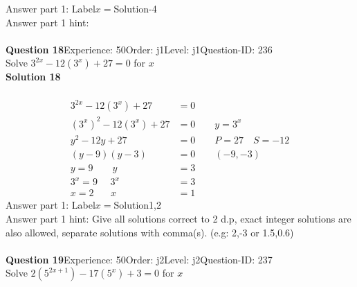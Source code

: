 \documentclass{article}
\begin{document}
Answer part 1: \hspace{10pt}Label\hspace{10pt}$x=$\hspace{10pt}Solution\hspace{10pt}-4\\
Answer part 1 hint: \hspace{15pt}\\
\\[4pt]
\noindent\textbf{Question 18}\hspace{20pt}Experience: 50\hspace{20pt}Order: j1\hspace{20pt}Level: j1\hspace{20pt}Question-ID: 236\\[2pt]
Solve $3^{2x}-12(3^x)+27=0$ for $x$\\[4pt]
\noindent\textbf{Solution 18}\\[2pt]
\\[-35pt]\begin{align*}
3^{2x}-12(3^x)+27&=0\\[2pt]
(3^x)^2-12(3^x)+27&=0\qquad y=3^x\\[2pt]
y^2-12y+27&=0\qquad P=27 \quad S=-12\\[2pt]
(y-9)(y-3)&=0\qquad (-9,-3)\\[2pt]
y=9 \qquad y&=3\\[2pt]
3^x=9\hspace{16pt} 3^x&=3\\[2pt]
x=2 \hspace{21pt} x&=1
\end{align*}
Answer part 1: \hspace{10pt}Label\hspace{10pt}$x=$\hspace{10pt}Solution\hspace{10pt}1,2\\
Answer part 1 hint: \hspace{15pt}Give all solutions correct to 2 d.p, exact integer solutions are also allowed, separate solutions with comma(s).  (e.g:  2,-3 or 1.5,0.6)  \\
\\[4pt]
\noindent\textbf{Question 19}\hspace{20pt}Experience: 50\hspace{20pt}Order: j2\hspace{20pt}Level: j2\hspace{20pt}Question-ID: 237\\[2pt]
Solve $2(5^{2x+1})-17(5^x)+3=0$ for $x$\\[4pt]
\end{document}
